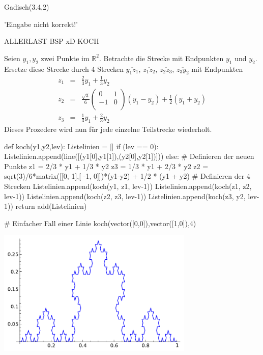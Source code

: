 \documentclass[fontsize=12pt,paper=a4,twoside,bibtotoc,idxtotoc,
liststotoc,pagesize,BCOR1.2cm,DIV15,chapterprefix,pagesize=pdftex]{scrbook}
\theoremstyle{plain}
\theoremstyle{definition}
\theoremstyle{remark}
\begin{document}
\begin{sagein}
Gadisch(3.4,2)
\end{sagein}
\begin{sage}
'Eingabe nicht korrekt!'
\end{sage}

ALLERLAST BSP xD
KOCH


 Seien $y_1,y_2$ zwei Punkte im $\mathbb{R}^2$. 
 Betrachte die Strecke mit Endpunkten $y_1$ und $y_2$.  
 Ersetze  diese Strecke durch 4 Strecken 
$\overline{y_1 z_1}$, $\overline{z_1 z_2}$, $\overline{z_2 z_3}$,
$\overline{z_3 y_2}$ mit Endpunkten 
\begin{eqnarray*}
 z_1 &=&\frac23 y_1 + \frac13 y_2\\[0.5cm]
 z_2 &=& \frac{\sqrt{3}}{6} \left( \begin{array}{cc}
 0 & 1 \\ -1 & 0 \\
 \end{array} \right)
 (y_1 - y_2) + \frac12 (y_1 + y_2)\\[0.5cm]
 z_3 &=&\frac13 y_1 + \frac23 y_2
\end{eqnarray*}
 Dieses Prozedere wird nun für jede einzelne Teilstrecke wiederholt.


\begin{sagein}
def koch(y1,y2,lev):
    Listelinien = []
    if (lev == 0):
        Listelinien.append(line([(y1[0],y1[1]),(y2[0],y2[1])]))
    else:
        # Definieren der neuen Punkte 
        z1 = 2/3 * y1 + 1/3 * y2
        z3 = 1/3 * y1 + 2/3 * y2
        z2 = sqrt(3)/6*matrix([[0, 1],[ -1, 0]])*(y1-y2) + 1/2 * (y1 + y2)
        # Definieren der 4 Strecken
        Listelinien.append(koch(y1, z1, lev-1))
        Listelinien.append(koch(z1, z2, lev-1))
        Listelinien.append(koch(z2, z3, lev-1))
        Listelinien.append(koch(z3, y2, lev-1))
    return add(Listelinien)
\end{sagein}

\begin{sagein}
# Einfacher Fall einer Linie 
koch(vector([0,0]),vector([1,0]),4)
\end{sagein}
\begin{center}
\includegraphics[width=0.7\textwidth]{koch.pdf} 
\end{center}
\end{document}

